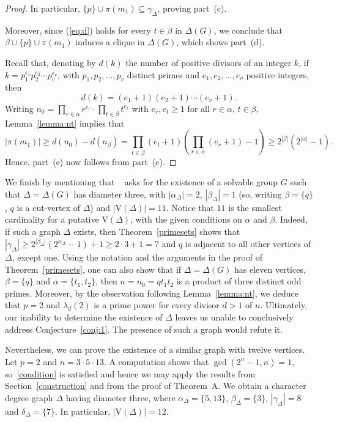 \documentclass{amsart}
\def\V#1{\mathrm{V}(#1)}
\begin{document}
\begin{proof}
In particular, $\{p\}\cup\pi(m_1) \subseteq \gamma_{\Delta}$, proving part~(c).

Moreover, since (\ref{eq:d}) holds for every  $t\in \beta$ in $\Delta(G)$, we conclude that
$\beta \cup \{p\}\cup\pi(m_1)$ induces a clique in $\Delta(G)$,  which shows part~(d).


Recall that, denoting by $d(k)$ the number of positive divisors of an integer $k$, if $k = p_1^{e_1}p_2^{e_2}\cdots p_v^{e_v}$, with
$p_1,p_2, \ldots, p_v$ distinct primes and $e_1, e_2,\ldots, e_v$ positive integers, then
$$d(k) = (e_1+1)(e_2+1)\cdots(e_v+1).$$  
Writing $n_0 = \prod_{r \in \alpha}r^{e_r} \cdot \prod_{t \in \beta}t^{e_t}$ with $e_r, e_t \geq 1$ for all $r\in \alpha$, $t\in \beta$, 
 Lemma~\ref{lemma:nt}   implies that
 $$|\pi(m_1)| \geq d(n_0)  - d(n_{\beta}) = \prod_{t \in \beta}(e_t +1) \left( \prod_{r \in \alpha}(e_r+1) -1 \right) \geq
 2^{|\beta|}(2^{|\alpha|} -1).$$
Hence,  part~(e) now follows from part~(c).
\end{proof}


We finish by mentioning that ~\cite[Question, page~91]{HHHI} asks for the existence of a solvable group $G$ such that $\Delta=\Delta(G)$ has diameter three, with  $|\alpha_{\Delta}| = 2$,   $|\beta_\Delta|=  1$
(so, writing $\beta = \{ q \}$, $q$ is a cut-vertex of $\Delta$) and $|\V\Delta|=11$. Notice that $11$ is the smallest cardinality
for a putative $\V\Delta$, with the given conditions on $\alpha$ and $\beta$. 
Indeed, if such a graph $\Delta$ exists, then Theorem~\ref{primesets} shows that  $|\gamma_\Delta|\ge 2^{|\beta_\Delta|}(2^{\alpha_\Delta}-1)+1\ge 2\cdot 3+1=7$ and  $q$ is adjacent to all other vertices of $\Delta$, except one. 
Using the notation and the arguments in the proof of Theorem~\ref{primesets}, one can also show that  if $\Delta = \Delta(G)$ has eleven vertices,
$\beta = \{q\}$ and $\alpha = \{t_1, t_2\}$, then $n = n_0 = q t_1t_2$ is a product of three distinct odd primes.
Moreover, by the observation following Lemma~\ref{lemma:nt}, we deduce that $p= 2$  and $\lambda_d(2)$ is a prime power for every divisor $d > 1$
of $n$. Ultimately, our inability to determine the existence of $\Delta$ leaves us unable to conclusively address Conjecture~\ref{conj:1}. The presence of such a graph would refute it.

Nevertheless, we can prove the existence of a similar graph with twelve vertices. 
Let  $p= 2$ and  $n = 3 \cdot 5 \cdot 13$. A computation shows that $\gcd(2^n-1,n)=1$, so~\eqref{condition} is satisfied and hence we may apply the results from Section~\ref{construction} and from the proof of Theorem~A. We obtain a character degree graph $\Delta$ having diameter three, where
$\alpha_\Delta = \{5, 13\}$, $\beta_\Delta= \{3\}$, $|\gamma_\Delta| = 8$ and  $\delta_\Delta=\{7\}$. In particular, $|\V\Delta|=12$.
\end{document}

